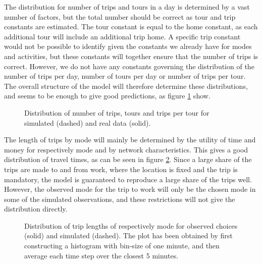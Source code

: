 The distribution for number of trips and tours in a day is determined by a vast number of factors, but the total number should be correct as tour and trip constants are estimated. The tour constant is equal to the home constant, as each additional tour will include an additional trip home. A specific trip constant would not be possible to identify given the constants we already have for modes and activities, but these constants will together ensure that the number of trips is correct. However, we do not have any constants governing the distribution of the number of trips per day, number of tours per day or number of trips per tour. The overall structure of the model will therefore determine these distributions, and seems to be enough to give good predictions, as figure \ref{fig:tours} show. 
\begin{figure}[b!]
%	
	\caption{Distribution of number of trips, tours and trips per tour for simulated (dashed) and real data (solid). \label{fig:tours}}
\end{figure}

The length of trips by mode will mainly be determined by the utility of time and money for respectively mode and by network characteristics. This gives a good distribution of travel times, as can be seen in figure \ref{fig:triplength}. Since a large share of the trips are made to and from work, where the location is fixed and the trip is mandatory, the model is guaranteed to reproduce a large share of the trips well. However, the observed mode for the trip to work will only be the chosen mode in some of the simulated observations, and these restrictions will not give the distribution directly. 
\begin{figure}[b!]
%	
	\caption{Distribution of trip lengths of respectively mode for observed choices (solid) and simulated (dashed). The plot has been obtained by first constructing a histogram with bin-size of one minute, and then average each time step over the closest 5 minutes. \label{fig:triplength}}
\end{figure}
 
